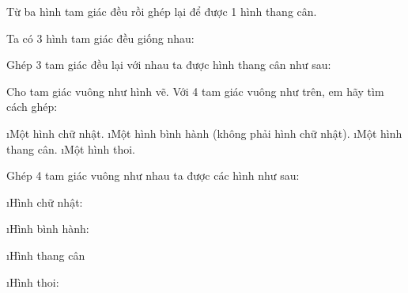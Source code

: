 \begin{bt}
	Từ ba hình tam giác đều rồi ghép lại để được 1 hình thang cân.
	\begin{loigiaichuong35}
		Ta có 3 hình tam giác đều giống nhau: 
		
		
		Ghép 3 tam giác đều lại với nhau ta được hình thang cân như sau: 
		
	\end{loigiaichuong35}
\end{bt}
\begin{bt}
	Cho tam giác vuông như hình vẽ. Với 4 tam giác vuông như trên, em hãy tìm cách ghép:
	\begin{enumerate}[a), leftmargin=*]
		\i Một hình chữ nhật.
		\i Một hình bình hành (không phải hình chữ nhật).
		\i Một hình thang cân.
		\i Một hình thoi.
	\end{enumerate}
	\begin{loigiaichuong35}
		Ghép 4 tam giác vuông như nhau ta được các hình như sau: 
		\begin{enumerate}[a), leftmargin=*]
			\i Hình chữ nhật: 
			
			\i Hình bình hành: 
			
			\i Hình thang cân 
			
			\i Hình thoi: 
		\end{enumerate}
		
	\end{loigiaichuong35}
\end{bt}
